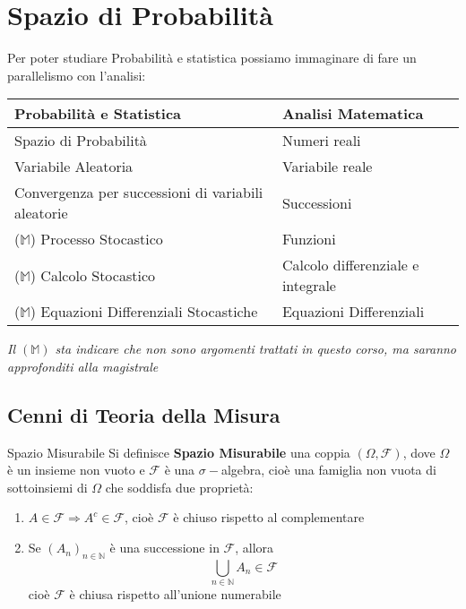 \documentclass[11pt, a4paper, twoside]{article}
\begin{document}

\tableofcontents

\newpage

\section{Spazio di Probabilità}

Per poter studiare Probabilità e statistica possiamo immaginare di fare un parallelismo con l'analisi:

\begin{center}
	\begin{tabular}{|l|l|}
		\hline
		\textbf{Probabilità e Statistica} & \textbf{Analisi Matematica}\\
		\hline
		{Spazio di Probabilità} & {Numeri reali}\\
		\hline
		{Variabile Aleatoria} & {Variabile reale}\\
		\hline
		{Convergenza per successioni di variabili aleatorie} & {Successioni}\\
		\hline
		{($\mathbb M$) Processo Stocastico} & {Funzioni}\\
		\hline
		{($\mathbb M$) Calcolo Stocastico} & {Calcolo differenziale e integrale}\\
		\hline
		{($\mathbb M$) Equazioni Differenziali Stocastiche } & {Equazioni Differenziali}\\
		\hline
	\end{tabular}
\end{center}

\textit{Il $(\mathbb M)$ sta indicare che non sono argomenti trattati in questo corso, ma saranno approfonditi alla magistrale}

\subsection{Cenni di Teoria della Misura}

\begin{defn}{Spazio Misurabile}{}
	Si definisce \textbf{Spazio Misurabile} una coppia $(\Omega, \mathcal F)$, dove $\Omega$ è un insieme non vuoto e $\mathcal F$ è una $\sigma-$algebra, cioè una famiglia non vuota di sottoinsiemi di $\Omega$ che soddisfa due proprietà:
	\begin{enumerate}
		\item $A \in \mathcal F \Rightarrow A^c \in \mathcal F$, cioè $\mathcal F$ è chiuso rispetto al complementare
		\item Se $(A_n)_{n \in \mathbb N}$ è una successione in $\mathcal F$, allora
			\[ \bigcup_{n \in \mathbb N}A_n \in \mathcal F \]
			cioè $\mathcal F$ è chiusa rispetto all'unione numerabile
	\end{enumerate}
\end{defn}
\end{document}
